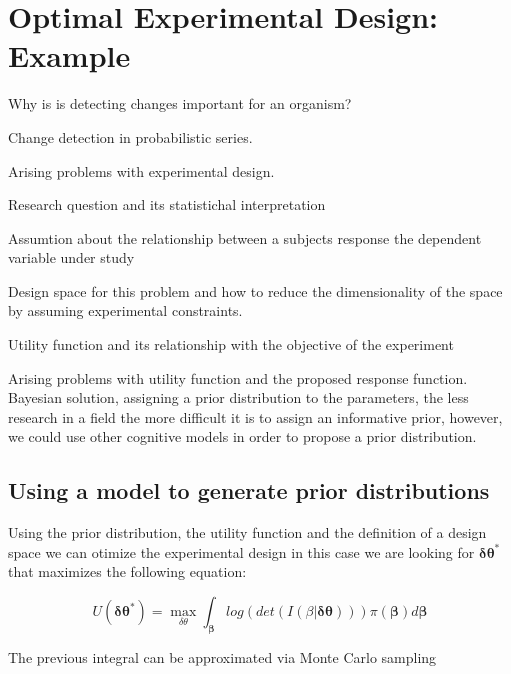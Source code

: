 \documentclass[preprint,review,12pt]{elsarticle}
\begin{document}

\section{Optimal Experimental Design: Example}
\label{S:2}

Why is is detecting changes important for an organism?

Change detection in probabilistic series.

Arising problems with experimental design.

Research question and its statistichal interpretation

Assumtion about the relationship between a subjects response the dependent variable under study

Design space for this problem and how to reduce the dimensionality of the space by assuming experimental constraints.

Utility function and its relationship with the objective of the experiment

Arising problems with utility function and the proposed response function. Bayesian solution, assigning a prior distribution to the parameters, the less research in a field the more difficult it is to assign an informative prior, however, we could use other cognitive models in order to propose a prior distribution. 
\subsection{Using a model to generate prior distributions}

Using the prior distribution, the utility function and the definition of a design space we can otimize the experimental design in this case we are looking for \begin{math}\mathbf{\delta\theta}^{*}\end{math} that maximizes the following equation:

\begin{equation}
U(\mathbf{\delta\theta}^{*})=\max_{\delta\theta} \int_{\mathbf{\beta}} log(det(I(\beta|\mathbf{\delta\theta}))) \pi(\mathbf{\beta}) d\mathbf{\beta}
\end{equation}

The previous integral can be approximated via Monte Carlo sampling
\end{document}
